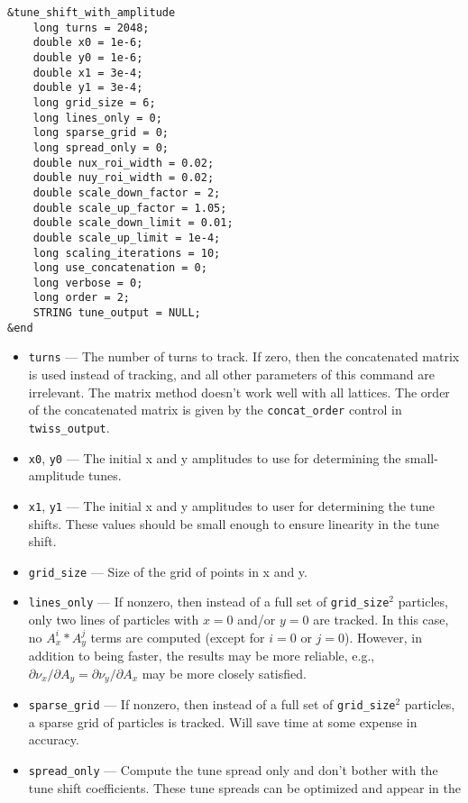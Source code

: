 \documentclass[11pt]{article}
\begin{document}
\begin{verbatim}
&tune_shift_with_amplitude
    long turns = 2048;
    double x0 = 1e-6;
    double y0 = 1e-6;
    double x1 = 3e-4;
    double y1 = 3e-4;
    long grid_size = 6;
    long lines_only = 0;
    long sparse_grid = 0;
    long spread_only = 0;
    double nux_roi_width = 0.02;
    double nuy_roi_width = 0.02;
    double scale_down_factor = 2;
    double scale_up_factor = 1.05;
    double scale_down_limit = 0.01;
    double scale_up_limit = 1e-4;
    long scaling_iterations = 10;
    long use_concatenation = 0;
    long verbose = 0;
    long order = 2;
    STRING tune_output = NULL;
&end
\end{verbatim}

\begin{itemize}
\item \verb|turns| --- The number of turns to track.  If zero, then the concatenated matrix
        is used instead of tracking, and all other parameters of this command are irrelevant.  
        The matrix method doesn't work well with all lattices.  The order
        of the concatenated matrix is given by the \verb|concat_order| control in 
        \verb|twiss_output|.
\item \verb|x0|, \verb|y0| --- The initial x and y amplitudes to use for determining the
        small-amplitude tunes.
\item \verb|x1|, \verb|y1| --- The initial x and y amplitudes to user for determining the
        tune shifts.  These values should be small enough to ensure linearity in the tune
        shift.  
\item \verb|grid_size| --- Size of the grid of points in x and y.  
\item \verb|lines_only| --- If nonzero, then instead of a full set of \verb|grid_size|$^2$
  particles, only two lines of particles with $x=0$ and/or $y=0$ are tracked.  In this
  case, no $A_x^i*A_y^j$ terms are computed (except for $i=0$ or $j=0$).  However, in addition
  to being faster, the results may be more reliable, e.g., $\partial \nu_x/\partial A_y = 
  \partial \nu_y/\partial A_x$ may be more closely satisfied.
\item \verb|sparse_grid| --- If nonzero, then instead of a full set of \verb|grid_size|$^2$
        particles, a sparse grid of particles is tracked.  Will save time at some expense
        in accuracy.
\item \verb|spread_only| --- Compute the tune spread only and don't bother with the
        tune shift coefficients.  These tune spreads can be optimized and appear in the

\end{itemize}
\end{document}
